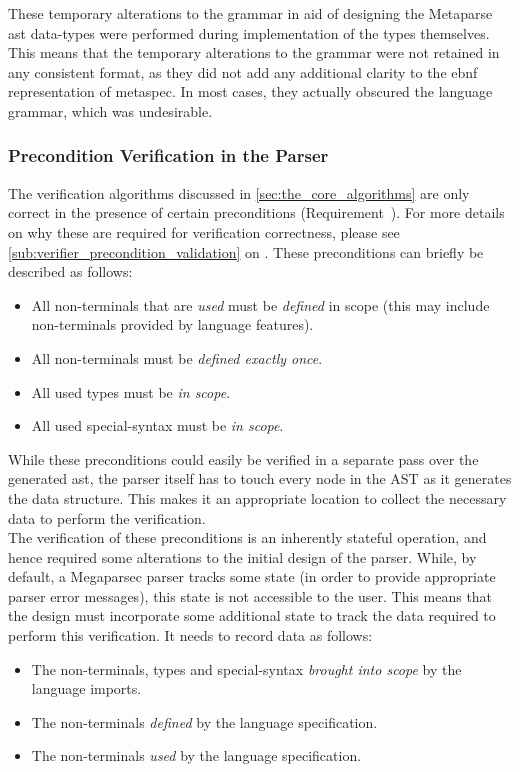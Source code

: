 These temporary alterations to the grammar in aid of designing the Metaparse \gls{ast} data-types were performed during implementation of the types themselves.
This means that the temporary alterations to the grammar were not retained in any consistent format, as they did not add any additional clarity to the \gls{ebnf} representation of \gls{metaspec}.
In most cases, they actually obscured the language grammar, which was undesirable.


\subsubsection{Precondition Verification in the Parser} %
\label{ssub:precondition_verification_in_the_parser}
The verification algorithms discussed in \autoref{sec:the_core_algorithms} are only correct in the presence of certain preconditions (Requirement~).
For more details on why these are required for verification correctness, please see \autoref{sub:verifier_precondition_validation} on .
These preconditions can briefly be described as follows:
\begin{itemize}
    \item All non-terminals that are \textit{used} must be \textit{defined} in scope (this may include non-terminals provided by language features).
    \item All non-terminals must be \textit{defined exactly once}.
    \item All used types must be \textit{in scope}.
    \item All used special-syntax must be \textit{in scope}. 
\end{itemize}

While these preconditions could easily be verified in a separate pass over the generated \gls{ast}, the parser itself has to touch every node in the AST as it generates the data structure.
This makes it an appropriate location to collect the necessary data to perform the verification.\\

The verification of these preconditions is an inherently stateful operation, and hence required some alterations to the initial design of the parser.
While, by default, a Megaparsec parser tracks some state (in order to provide appropriate parser error messages), this state is not accessible to the user. 
This means that the design must incorporate some additional state to track the data required to perform this verification.
It needs to record data as follows:
\begin{itemize}
    \item The non-terminals, types and special-syntax \textit{brought into scope} by the language imports.
    \item The non-terminals \textit{defined} by the language specification.
    \item The non-terminals \textit{used} by the language specification. 
\end{itemize}

